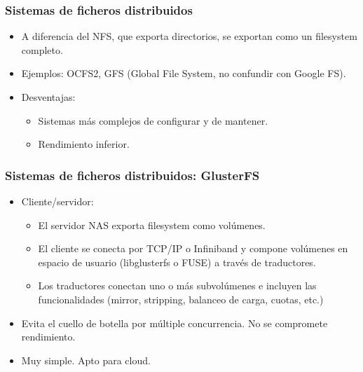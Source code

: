 \documentclass{beamer}
\begin{document}
\begin{frame}
  \frametitle{Sistemas de ficheros distribuidos}

  \begin{itemize}

    \item A diferencia del NFS, que exporta directorios, \alert{se exportan como un filesystem completo}. 
    \item Ejemplos: OCFS2, GFS (Global File System, no confundir con Google FS).

    \item Desventajas:

  \begin{itemize}
	\item Sistemas más complejos de configurar y de mantener.
	\item Rendimiento inferior.
  \end{itemize}

  \end{itemize}
\end{frame}

\begin{frame}
  \frametitle{Sistemas de ficheros distribuidos: GlusterFS}

  \begin{itemize}
    \item Cliente/servidor: 
	  \begin{itemize}
	  \item El \alert{servidor} NAS exporta filesystem como volúmenes. 
	  \item El \alert{cliente} se conecta por TCP/IP o Infiniband y compone volúmenes en espacio de usuario (libglusterfs o FUSE) a través de \alert{traductores}.
          \item Los \alert{traductores} conectan uno o más subvolúmenes e incluyen las funcionalidades (mirror, stripping, balanceo de carga, cuotas, etc.)
	  \end{itemize}
    \item Evita el cuello de botella por múltiple concurrencia. No se compromete rendimiento.
    \item Muy simple. Apto para cloud.

  \end{itemize}
\end{frame}
\end{document}

